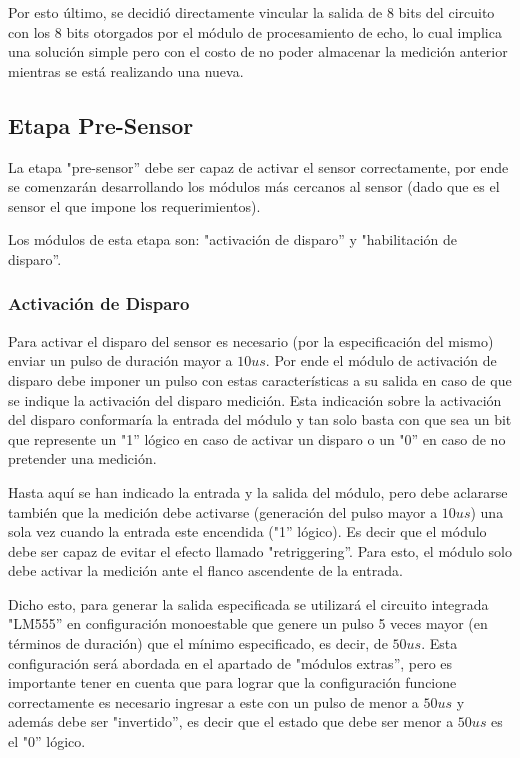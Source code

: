 Por esto último, se decidió directamente vincular la salida de 8 bits
del circuito con los 8 bits otorgados por el módulo de procesamiento
de echo, lo cual implica una solución simple pero con el costo de
no poder almacenar la medición anterior mientras se está realizando
una nueva.

\subsection{Etapa Pre-Sensor}

La etapa "pre-sensor'' debe ser capaz de activar el sensor correctamente,
por ende se comenzarán desarrollando los módulos más cercanos al sensor
(dado que es el sensor el que impone los requerimientos).

Los módulos de esta etapa son: "activación de disparo'' y "habilitación
de disparo''.

\subsubsection{Activación de Disparo}

Para activar el disparo del sensor es necesario (por la especificación
del mismo) enviar un pulso de duración mayor a $10us$. Por ende el
módulo de activación de disparo debe imponer un pulso con estas características
a su salida en caso de que se indique la activación del disparo medición.
Esta indicación sobre la activación del disparo conformaría la entrada
del módulo y tan solo basta con que sea un bit que represente un "1''
lógico en caso de activar un disparo o un "0'' en caso de no pretender
una medición.\newline

Hasta aquí se han indicado la entrada y la salida del módulo, pero
debe aclararse también que la medición debe activarse (generación
del pulso mayor a $10us$) una sola vez cuando la entrada este encendida
("1'' lógico). Es decir que el módulo debe ser capaz de evitar
el efecto llamado "retriggering''. Para esto, el módulo solo debe
activar la medición ante el flanco ascendente de la entrada.

Dicho esto, para generar la salida especificada se utilizará el circuito
integrada "LM555'' en configuración monoestable que genere un pulso
5 veces mayor (en términos de duración) que el mínimo especificado,
es decir, de $50us$. Esta configuración será abordada en el apartado
de "módulos extras'', pero es importante tener en cuenta que para
lograr que la configuración funcione correctamente es necesario ingresar
a este con un pulso de menor a $50us$ y además debe ser "invertido'',
es decir que el estado que debe ser menor a $50us$ es el "0''
lógico.

